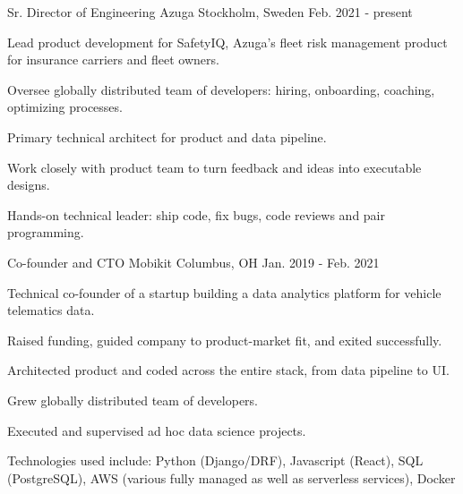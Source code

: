 

\begin{cventries}

  \cventry
    {Sr. Director of Engineering} %
    {Azuga} %
    {Stockholm, Sweden} %
    {Feb. 2021 - present} %
    {
      \begin{cvitems} %
        \item {Lead product development for SafetyIQ, Azuga's fleet risk management product for insurance carriers and fleet owners.}
        \item {Oversee globally distributed team of developers: hiring, onboarding, coaching, optimizing processes.}
        \item {Primary technical architect for product and data pipeline.}
        \item {Work closely with product team to turn feedback and ideas into executable designs.}
        \item {Hands-on technical leader: ship code, fix bugs, code reviews and pair programming.}
      \end{cvitems}
    }

  \cventry
    {Co-founder and CTO} %
    {Mobikit} %
    {Columbus, OH} %
    {Jan. 2019 - Feb. 2021} %
    {
      \begin{cvitems} %
        \item {Technical co-founder of a startup building a data analytics platform for vehicle telematics data.}
        \item {Raised funding, guided company to product-market fit, and exited successfully.}
        \item {Architected product and coded across the entire stack, from data pipeline to UI.}
        \item {Grew globally distributed team of developers.}
        \item {Executed and supervised ad hoc data science projects.}
        \item {Technologies used include: Python (Django/DRF), Javascript (React), SQL (PostgreSQL), AWS (various fully managed as well as serverless services), Docker}
      \end{cvitems}
    }


\end{cventries}
